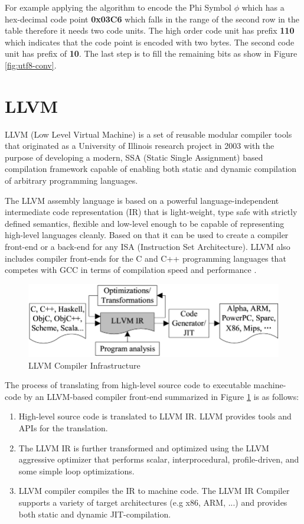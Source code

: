 For example applying the algorithm to encode the Phi Symbol $\phi$ which has a hex-decimal code point \textbf{0x03C6} which falls in the range of the second row in the table therefore it needs two code units. The high order code unit has prefix \textbf{110} which indicates that the code point is encoded with two bytes. The second code unit has prefix of \textbf{10}. The last step is to fill the remaining bits as show in Figure \ref{fig:utf8-conv}.
\section{LLVM}
LLVM (Low Level Virtual Machine) \cite{llvm} is a set of reusable modular compiler tools that originated as a University of Illinois research project in 2003 with the purpose of developing a modern, SSA (Static Single Assignment) based compilation framework capable of enabling both static and dynamic compilation of arbitrary programming languages.

The LLVM assembly language is based on a powerful language-independent intermediate code representation (IR) that is light-weight, type safe with strictly defined semantics, flexible and low-level enough to be capable of representing high-level languages cleanly. Based on that it can be used to create a compiler front-end or a back-end for any ISA (Instruction Set Architecture). LLVM also includes compiler front-ends for the C and C++ programming languages that competes with GCC in terms of compilation speed and performance \cite{llvmgcc}.

\begin{figure}[ht]
\includegraphics[width=\textwidth]{imgs/llvm-arch.png}
\caption[LLVM Compiler Infrastructure]{LLVM Compiler Infrastructure \cite{llvminfra}}\label{fig:llvminfra}
\end{figure}

The process of translating from high-level source code to executable machine-code by an LLVM-based compiler front-end summarized in Figure \ref{fig:llvminfra} is as follows:
\begin{enumerate}
    \item High-level source code is translated to LLVM IR. LLVM provides tools and APIs for the translation.
    \item The LLVM IR is further transformed and optimized using the LLVM aggressive optimizer that performs scalar, interprocedural, profile-driven, and some simple loop optimizations.
    \item LLVM compiler compiles the IR to machine code. The LLVM IR Compiler supports a variety of target architectures (e.g x86, ARM, ...) and provides both static and dynamic JIT-compilation.
\end{enumerate}

